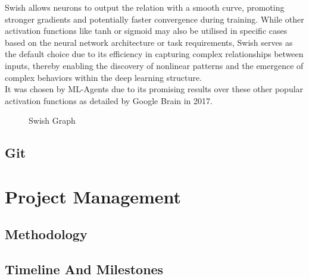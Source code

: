 \documentclass{article}
\begin{document}
Swish allows neurons to output the relation with a smooth curve, promoting stronger gradients and potentially faster convergence during training. While other activation functions like tanh or sigmoid may also be utilised in specific cases based on the neural network architecture or task requirements, Swish serves as the default choice due to its efficiency in capturing complex relationships between inputs, thereby enabling the discovery of nonlinear patterns and the emergence of complex behaviors within the deep learning structure.\\

It was chosen by ML-Agents due to its promising results over these other popular activation functions as detailed by Google Brain in 2017.

\begin{figure}[h]
    \centering
    \caption{Swish Graph}
\end{figure}

\subsection{Git}
\lipsum[2][1]


\section{Project Management}

\subsection{Methodology}
\lipsum[2][1]

\subsection{Timeline And Milestones}
\lipsum[2][1]
\end{document}
